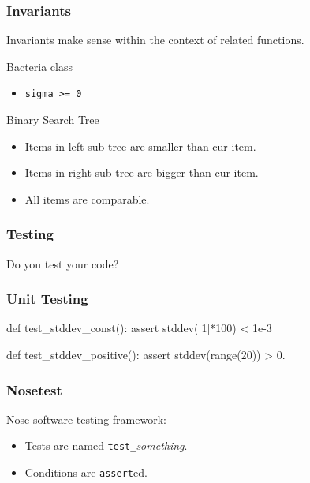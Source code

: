 \begin{frame}[fragile]
\frametitle{Invariants}
Invariants make sense within the context of related functions.
\end{frame}

\begin{frame}[fragile]
\begin{block}{Bacteria class}
\begin{itemize}
\item \lstinline{sigma >= 0}
\end{itemize}
\end{block}

\begin{block}{Binary Search Tree}
\begin{itemize}
\item Items in left sub-tree are smaller than cur item.
\item Items in right sub-tree are bigger than cur item.
\item All items are comparable.
\end{itemize}
\end{block}
\end{frame}

\begin{frame}[fragile]
\frametitle{Testing}

Do you test your code?

\end{frame}

\begin{frame}[fragile]
\frametitle{Unit Testing}

\begin{python}
def test_stddev_const():
    assert stddev([1]*100) < 1e-3

def test_stddev_positive():
    assert stddev(range(20)) > 0.
\end{python}

\end{frame}

\begin{frame}[fragile]
\frametitle{Nosetest}

Nose software testing framework:
\begin{itemize}
\item Tests are named \lstinline{test_}\textit{something}.
\item Conditions are \lstinline{assert}ed.
\end{itemize}

\end{frame}

